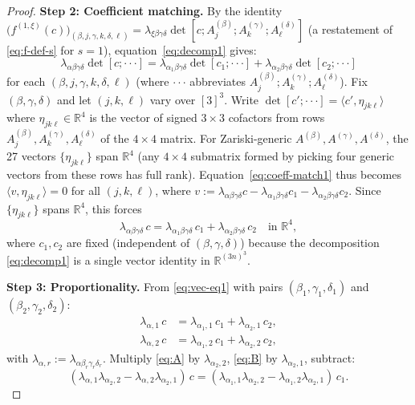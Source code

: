 \documentclass[12pt]{article}
\theoremstyle{definition}
\newcommand{\bR}{\mathbb{R}}
\begin{document}
\begin{proof}
\noindent\textbf{Step 2: Coefficient matching.}
By the identity $\bigl(f^{(1,\xi)}(c)\bigr)_{(\beta,j,\gamma,k,\delta,\ell)}
= \lambda_{\xi\beta\gamma\delta}\det[c;A^{(\beta)}_j;A^{(\gamma)}_k;A^{(\delta)}_\ell]$
(a restatement of \eqref{eq:f-def-s} for $s=1$), equation~\eqref{eq:decomp1} gives:
\begin{equation}\label{eq:coeff-match1}
  \lambda_{\alpha\beta\gamma\delta}\det[c;\cdot\cdot\cdot]
  = \lambda_{\alpha_1\beta\gamma\delta}\det[c_1;\cdot\cdot\cdot]
  + \lambda_{\alpha_2\beta\gamma\delta}\det[c_2;\cdot\cdot\cdot]
\end{equation}
for each $(\beta,j,\gamma,k,\delta,\ell)$ (where $\cdot\cdot\cdot$ abbreviates
$A^{(\beta)}_j;A^{(\gamma)}_k;A^{(\delta)}_\ell$).
Fix $(\beta,\gamma,\delta)$ and let $(j,k,\ell)$ vary over $[3]^3$.
Write $\det[c';\cdot\cdot\cdot] = \langle c',\eta_{jk\ell}\rangle$ where
$\eta_{jk\ell}\in\bR^4$ is the vector of signed $3\times3$ cofactors from rows
$A^{(\beta)}_j,A^{(\gamma)}_k,A^{(\delta)}_\ell$ of the $4\times4$ matrix.
For Zariski-generic $A^{(\beta)},A^{(\gamma)},A^{(\delta)}$, the 27 vectors $\{\eta_{jk\ell}\}$
span $\bR^4$ (any $4\times4$ submatrix formed by picking four generic vectors from these
rows has full rank).
Equation~\eqref{eq:coeff-match1} thus becomes $\langle v,\eta_{jk\ell}\rangle=0$ for all
$(j,k,\ell)$, where $v:=\lambda_{\alpha\beta\gamma\delta}c-\lambda_{\alpha_1\beta\gamma\delta}c_1
-\lambda_{\alpha_2\beta\gamma\delta}c_2$.  Since $\{\eta_{jk\ell}\}$ spans $\bR^4$, this forces
\begin{equation}\label{eq:vec-eq1}
  \lambda_{\alpha\beta\gamma\delta}\,c
  = \lambda_{\alpha_1\beta\gamma\delta}\,c_1 + \lambda_{\alpha_2\beta\gamma\delta}\,c_2
  \quad\text{in }\bR^4,
\end{equation}
where $c_1,c_2$ are fixed (independent of $(\beta,\gamma,\delta)$) because the decomposition
\eqref{eq:decomp1} is a single vector identity in $\bR^{(3n)^3}$.

\noindent\textbf{Step 3: Proportionality.}
From \eqref{eq:vec-eq1} with pairs $(\beta_1,\gamma_1,\delta_1)$ and $(\beta_2,\gamma_2,\delta_2)$:
\begin{align}
  \lambda_{\alpha,1}\,c &= \lambda_{\alpha_1,1}\,c_1 + \lambda_{\alpha_2,1}\,c_2,
  \label{eq:A}\\
  \lambda_{\alpha,2}\,c &= \lambda_{\alpha_1,2}\,c_1 + \lambda_{\alpha_2,2}\,c_2,
  \label{eq:B}
\end{align}
with $\lambda_{\alpha,r}:=\lambda_{\alpha\beta_r\gamma_r\delta_r}$.
Multiply \eqref{eq:A} by $\lambda_{\alpha_2,2}$, \eqref{eq:B} by $\lambda_{\alpha_2,1}$, subtract:
\begin{equation}\label{eq:elim1}
  (\lambda_{\alpha,1}\lambda_{\alpha_2,2}-\lambda_{\alpha,2}\lambda_{\alpha_2,1})\,c
  = (\lambda_{\alpha_1,1}\lambda_{\alpha_2,2}-\lambda_{\alpha_1,2}\lambda_{\alpha_2,1})\,c_1.
\end{equation}


\end{proof}
\end{document}
